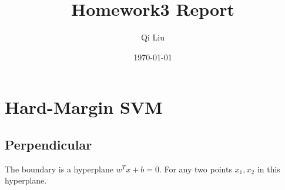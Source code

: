 \documentclass{article}
\title{Homework3 Report}
\author{Qi Liu}
\date{\today}
\begin{document}
	
\maketitle

\section{Hard-Margin SVM}

\subsection{Perpendicular}
The boundary is a hyperplane $w^Tx+b=0$. For any two points $x_1, x_2$ in this hyperplane.
\end{document}
